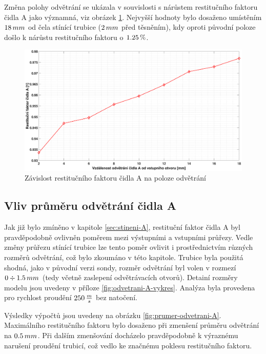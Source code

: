         Změna polohy odvětrání se ukázala v souvislosti s nárůstem restitučního faktoru čidla A jako významná, viz obrázek \ref{fig:poloha-odvetrani-A}. Nejvyšší hodnoty bylo dosaženo umístěním $18 \, mm$ od čela stínící trubice ($2 \, mm$ před těsněním), kdy oproti původní poloze došlo k nárůstu restitučního faktoru o $1.25 \, \%$.
        
          \begin{figure}[ht!]
            \centering
            \includegraphics*[width=\textwidth, trim={5.25cm 1.0cm 5.8cm 2.0cm}]{400_SIMULACE_KONSTRUKCNICH_UPRAV/Grafy/06_poloha_odvetrani_A.eps}
            \caption{Závislost restitučního faktoru čidla A na poloze odvětrání}
            \label{fig:poloha-odvetrani-A}
        \end{figure}
    
    \newpage
    \subsection{Vliv průměru odvětrání čidla A} \label{sec:prumer-odvetrani}
        Jak již bylo zmíněno v kapitole \ref{sec:stineni-A}, restituční faktor čidla A byl pravděpodobně ovlivněn poměrem mezi výstupními a vstupními průřezy. Vedle změny průřezu stínící trubice lze tento poměr ovlivit i prostřednictvím různých rozměrů odvětrání, což bylo zkoumáno v této kapitole. Trubice byla použitá shodná, jako v původní verzi sondy, rozměr odvětrání byl volen v rozmezí $0 \div 1.5 \, mm$ (tedy včetně zaslepení odvětrávacích otvorů). Detainí rozměry modelu jsou uvedeny v příloze \ref{fig:odvetrani-A-vykres}. Analýza byla provedena pro rychlost proudění $250 \, \frac{m}{s}$ bez natočení.

        Výsledky výpočtů jsou uvedeny na obrázku \ref{fig:prumer-odvetrani-A}. Maximálního restitučního faktoru bylo dosaženo při zmenšení průměru odvětrání na $0.5 \, mm$. Při dalším zmenšování docházelo pravděpodobně k výraznému narušení proudění trubicí, což vedlo ke značnému poklesu restitučního faktoru.
        
